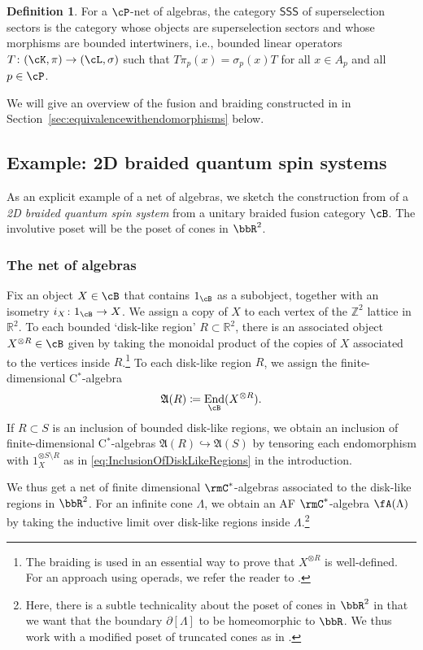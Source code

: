 \documentclass[11pt,reqno]{amsart}
\DeclareMathOperator{\End}{End}
\newcommand{\SSS}{\mathsf{SSS}}
\numberwithin{equation}{section}
\theoremstyle{plain}
\theoremstyle{definition}
\newtheorem{definition}[equation]{Definition}
\begin{document}
\begin{definition}
    For a $\cP$-net of algebras, the category $\SSS$ of superselection sectors is the category whose objects are superselection sectors and whose morphisms are bounded intertwiners, i.e., bounded linear operators $T \colon (\cK,\pi) \to (\cL, \sigma)$ such that $T\pi_p(x)=\sigma_p(x)T$ for all $x \in A_p$ and all $p \in \cP$.
\end{definition}
\noindent We will give an overview of the fusion and braiding constructed in \cite{MR4927814} in Section~\ref{sec:equivalencewithendomorphisms} below.

\subsection{Example: 2D braided quantum spin systems}
As an explicit example of a net of algebras, we sketch the construction from \cite[\S4]{2506.19969} of a \emph{2D braided quantum spin system}
from a unitary braided fusion category $\cB$.
The involutive poset will be the poset of cones in $\bbR^2$.

\subsubsection*{The net of algebras}
Fix an object $X \in \cB$ that contains $1_{\cB}$ as a subobject, together with an isometry $i_X\colon 1_{\cB} \to X$.
We assign a copy of $X$ to each vertex of the $\mathbb Z^2$ lattice in $\mathbb R^2$. 
To each bounded `disk-like region' \cite[Def.~2.4]{2605.10693} $R\subset \mathbb R^2$, there is an associated object $X^{\otimes R}\in \cB$ given by taking the monoidal product of the copies of $X$ associated to the vertices inside $R$.\footnote{The braiding is used in an essential way to prove that $X^{\otimes R}$ is well-defined.
For an approach using operads, we refer the reader to \cite{MR1989873}.
}
To each disk-like region $R$, we assign the finite-dimensional C$^*$-algebra 
$$\mathfrak A(R)\coloneq \End_{\cB}(X^{\otimes R}).$$
If $R \subset S$ is an inclusion of bounded disk-like regions, we obtain an inclusion of finite-dimensional C$^*$-algebras $\mathfrak A(R)\hookrightarrow \mathfrak A(S)$ by tensoring each endomorphism with $1_X^{\otimes S\setminus R}$ as in \eqref{eq:InclusionOfDiskLikeRegions} in the introduction. 

We thus get a net of finite dimensional $\rmC^*$-algebras associated to the disk-like regions in $\bbR^2$.
For an infinite cone $\Lambda$, we obtain an AF $\rmC^*$-algebra $\fA(\Lambda)$ by taking the inductive limit over disk-like regions inside $\Lambda$.\footnote{Here, there is a subtle technicality about the poset of cones in $\bbR^2$ in that we want that the boundary $\partial[\Lambda]$ to be homeomorphic to $\bbR$.
We thus work with a modified poset of truncated cones as in \cite[\S2.1]{2605.10693}.
}
\end{document}

